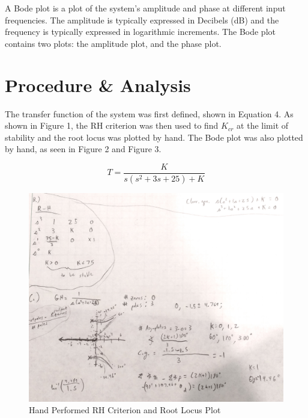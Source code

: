 \documentclass[12pt]{article}
\begin{document}
A Bode plot is a plot of the system's amplitude and phase at different input frequencies. The amplitude is typically expressed in Decibels (dB) and the frequency is typically expressed in logarithmic increments. The Bode plot contains two plots: the amplitude plot, and the phase plot. 



\section*{\fontsize{12}{12}\selectfont \large Procedure \& Analysis}
The transfer function of the system was first defined, shown in Equation 4. As shown in Figure 1, the RH criterion was then used to find $K_{cr}$ at the limit of stability and the root locus was plotted by hand. The Bode plot was also plotted by hand, as seen in Figure 2 and Figure 3. 
\bigskip

\begin{equation}
T = \frac{K}{s(s^2 + 3s + 25) + K}
\end{equation}

\newpage

\begin{figure}[h!] %
   \centering
   \includegraphics[width=4.5in]{hand_drawn_root_locus.jpg} 
   \caption{Hand Performed RH Criterion and Root Locus Plot}
   \label{fig:example}
\end{figure}
\end{document}
